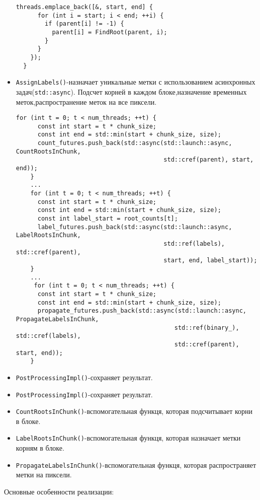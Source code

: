 \documentclass[12pt]{extarticle}
\begin{document}
\begin{itemize}
\begin{lstlisting}[caption={Обновление родительских ссылок в методе FinalizeRoots},label={all9}]
    threads.emplace_back([&, start, end] {
      for (int i = start; i < end; ++i) {
        if (parent[i] != -1) {
          parent[i] = FindRoot(parent, i);
        }
      }
    });
  }
  \end{lstlisting}
  \item \texttt{AssignLabels()}-назначает уникальные метки с использованием асинхронных задач(\texttt{std::async}). Подсчет корней в каждом блоке,назначение временных меток,распространение меток на все пиксели.
  \begin{lstlisting}[caption={Назначение уникальных меток в методе AssignLabels},label={all10}]
   for (int t = 0; t < num_threads; ++t) {
      const int start = t * chunk_size;
      const int end = std::min(start + chunk_size, size);
      count_futures.push_back(std::async(std::launch::async, CountRootsInChunk, 
                                         std::cref(parent), start, end));
    }
    ...
    for (int t = 0; t < num_threads; ++t) {
      const int start = t * chunk_size;
      const int end = std::min(start + chunk_size, size);
      const int label_start = root_counts[t];
      label_futures.push_back(std::async(std::launch::async, LabelRootsInChunk, 
                                         std::ref(labels), std::cref(parent), 
                                         start, end, label_start));
    }
    ...
     for (int t = 0; t < num_threads; ++t) {
      const int start = t * chunk_size;
      const int end = std::min(start + chunk_size, size);
      propagate_futures.push_back(std::async(std::launch::async, PropagateLabelsInChunk, 
                                            std::ref(binary_), std::cref(labels), 
                                            std::cref(parent), start, end));
    }
     \end{lstlisting}
    \item \texttt{PostProcessingImpl()}-сохраняет результат.
   \item \texttt{PostProcessingImpl()}-сохраняет результат.
    \item \texttt{CountRootsInChunk()}-вспомогательная функця, которая подсчитывает корни в блоке.
    \item \texttt{LabelRootsInChunk()}-вспомогательная функця, которая назначает метки корням в блоке.
    \item \texttt{PropagateLabelsInChunk()}-вспомогательная функця, которая распространяет метки на пиксели.
    
\end{itemize}
Основные особенности реализации:
\end{document}
